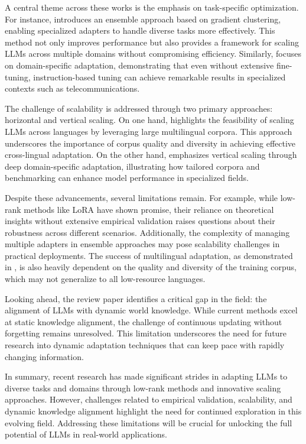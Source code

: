 \documentclass[conference]{IEEEtran}
\begin{document}
A central theme across these works is the emphasis on task-specific optimization. For instance, \cite{bX} introduces an ensemble approach based on gradient clustering, enabling specialized adapters to handle diverse tasks more effectively. This method not only improves performance but also provides a framework for scaling LLMs across multiple domains without compromising efficiency. Similarly, \cite{bX} focuses on domain-specific adaptation, demonstrating that even without extensive fine-tuning, instruction-based tuning can achieve remarkable results in specialized contexts such as telecommunications.

The challenge of scalability is addressed through two primary approaches: horizontal and vertical scaling. On one hand, \cite{bX} highlights the feasibility of scaling LLMs across languages by leveraging large multilingual corpora. This approach underscores the importance of corpus quality and diversity in achieving effective cross-lingual adaptation. On the other hand, \cite{bX} emphasizes vertical scaling through deep domain-specific adaptation, illustrating how tailored corpora and benchmarking can enhance model performance in specialized fields.

Despite these advancements, several limitations remain. For example, while low-rank methods like LoRA have shown promise, their reliance on theoretical insights without extensive empirical validation raises questions about their robustness across different scenarios. Additionally, the complexity of managing multiple adapters in ensemble approaches may pose scalability challenges in practical deployments. The success of multilingual adaptation, as demonstrated in \cite{bX}, is also heavily dependent on the quality and diversity of the training corpus, which may not generalize to all low-resource languages.

Looking ahead, the review paper \cite{bX} identifies a critical gap in the field: the alignment of LLMs with dynamic world knowledge. While current methods excel at static knowledge alignment, the challenge of continuous updating without forgetting remains unresolved. This limitation underscores the need for future research into dynamic adaptation techniques that can keep pace with rapidly changing information.

In summary, recent research has made significant strides in adapting LLMs to diverse tasks and domains through low-rank methods and innovative scaling approaches. However, challenges related to empirical validation, scalability, and dynamic knowledge alignment highlight the need for continued exploration in this evolving field. Addressing these limitations will be crucial for unlocking the full potential of LLMs in real-world applications.
\end{document}
